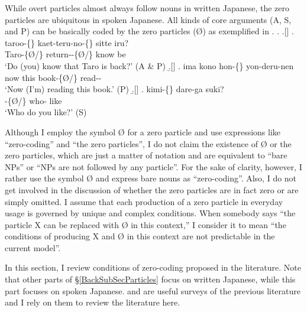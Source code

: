While overt particles almost always follow nouns in written Japanese,
the zero particles are ubiquitous in spoken Japanese.
All kinds of core arguments (A, S, and P) can be basically coded by the zero particles ({\O}) as exemplified in \Next.
%
\ex. \a.[] 
	\bg. {taroo-\{\}} {kaet-teru-no-\{\}} sitte iru? \\
		Taro-\{{\O}/\} return--\{{\O}/\} know be \\
		`Do (you) know that Taro is back?' \hfill{(A \& P)}
	\b.[] 
	\bg. ima kono {hon-\{\}} yon-deru-nen \\
		now this book-\{{\O}/\} read-- \\
		`Now (I'm) reading this book.' \hfill{(P)}
	\b.[] 
	\bg. {kimi-\{\}} dare-ga suki? \\
		-\{{\O}/\} who- like \\
		`Who do you like?' \hfill{(S)}
		\begin{flushright}
		{\cite[pp.\ 367-368, glosses modified]{shibatani90}}
		\end{flushright}

Although I employ the symbol {\O} for a zero particle and
use expressions like ``zero-coding'' and ``the zero particles'',
I do not claim the existence of {\O} or the zero particles,
which are just a matter of notation and
are equivalent to ``bare NPs'' or ``NPs are not followed by any particle''.
For the sake of clarity, however,
I rather use the symbol {\O} and express bare nouns as ``zero-coding''.
Also, I do not get involved in the discussion of whether
the zero particles are in fact zero or are simply omitted.
I assume that each production of a zero particle in everyday usage is governed by unique and complex conditions.
When somebody says ``the particle X can be replaced with {\O} in this context,''
I consider it to mean ``the conditions of producing X and {\O} in this context are not predictable in the current model''.

In this section, I review conditions of zero-coding proposed in the literature.
Note that other parts of \S \ref{BackSubSecParticles}
focus on written Japanese,
while this part focuses on spoken Japanese.
 and  are useful surveys of the previous literature and
I rely on them to review the literature here.

